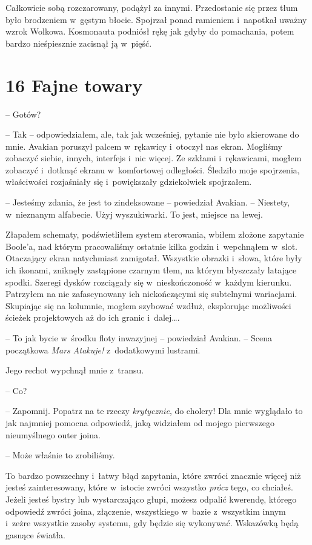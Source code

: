 \documentclass[oneside,polish,12pt,sfheadings]{mwbk}
\begin{document}
Całkowicie sobą rozczarowany, podążył za innymi. Przedostanie się przez
tłum było brodzeniem w~gęstym błocie. Spojrzał ponad ramieniem i~napotkał uważny wzrok Wolkowa. Kosmonauta podniósł rękę jak gdyby do
pomachania, potem bardzo nieśpiesznie zacisnął ją w~pięść.


\chapter[Fajne towary]{16 Fajne towary}



-- Gotów? 

-- Tak -- odpowiedziałem, ale, tak jak wcześniej, pytanie nie
było skierowane do mnie. Avakian poruszył palcem w~rękawicy i~otoczył
nas ekran. Mogliśmy zobaczyć siebie, innych, interfejs i~nic więcej. Ze
szkłami i~rękawicami, mogłem zobaczyć i~dotknąć ekranu w~komfortowej
odległości. Śledziło moje spojrzenia, właściwości rozjaśniały się i~powiększały gdziekolwiek spojrzałem.

-- Jesteśmy zdania, że jest to zindeksowane -- powiedział Avakian. -- Niestety, w~nieznanym alfabecie. Użyj wyszukiwarki. To jest, miejsce na
lewej.

Złapałem schematy, podświetliłem system sterowania, wbiłem złożone
zapytanie Boole'a, nad którym pracowaliśmy ostatnie kilka godzin i~wepchnąłem w~slot. Otaczający ekran natychmiast zamigotał. Wszystkie
obrazki i~słowa, które były ich ikonami, zniknęły zastąpione czarnym
tłem, na którym błyszczały latające spodki. Szeregi dysków rozciągały
się w~nieskończoność w~każdym kierunku. Patrzyłem na nie zafascynowany
ich niekończącymi się subtelnymi wariacjami. Skupiając się na kolumnie,
mogłem szybować wzdłuż, eksplorując możliwości ścieżek projektowych aż
do ich granic i~dalej\ldots .

-- To jak bycie w~środku floty inwazyjnej -- powiedział Avakian. -- Scena
początkowa \emph{Mars Atakuje!} z~dodatkowymi lustrami.

Jego rechot wypchnął mnie z~transu.

-- Co?

-- Zapomnij. Popatrz na te rzeczy \emph{krytycznie}, do cholery! Dla mnie
wyglądało to jak najmniej pomocna odpowiedź, jaką widziałem od mojego
pierwszego nieumyślnego outer joina.

-- Może właśnie to zrobiliśmy.

To bardzo powszechny i~łatwy błąd zapytania, które zwróci
znacznie więcej niż jesteś zainteresowany, które w~istocie zwróci
wszystko \emph{prócz} tego, co chciałeś. Jeżeli jesteś bystry lub
wystarczająco głupi, możesz odpalić kwerendę, którego odpowiedź zwróci
joina, złączenie, wszystkiego w~bazie z~wszystkim innym i~zeżre
wszystkie zasoby systemu, gdy będzie się wykonywać. Wskazówką będą gasnące
światła.
\end{document}
